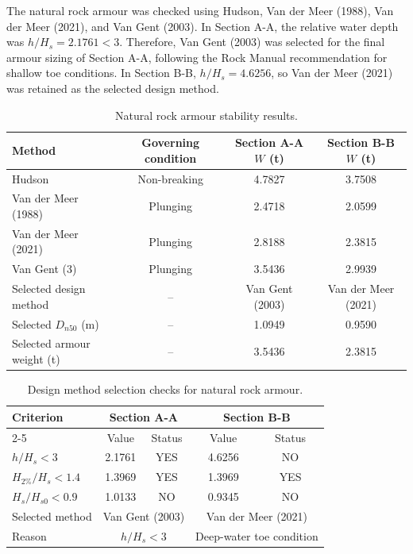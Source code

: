 \documentclass[a4paper, 11pt]{article}
\begin{document}
The natural rock armour was checked using Hudson, Van der Meer (1988), Van der Meer (2021), and Van Gent (2003). In Section A-A, the relative water depth was \(h/H_s=2.1761<3\). Therefore, Van Gent (2003) was selected for the final armour sizing of Section A-A, following the Rock Manual recommendation for shallow toe conditions. In Section B-B, \(h/H_s=4.6256\), so Van der Meer (2021) was retained as the selected design method.

\begin{table}[H]
\centering
\caption{Natural rock armour stability results.}
\label{tab:rmbw_rock_methods}
\begin{tabular}{l c c c}
\hline
Method & Governing condition & Section A-A \(W\) (t) & Section B-B \(W\) (t) \\
\hline
Hudson & Non-breaking & 4.7827 & 3.7508 \\
Van der Meer (1988) & Plunging & 2.4718 & 2.0599 \\
Van der Meer (2021) & Plunging & 2.8188 & 2.3815 \\
Van Gent (3) & Plunging & 3.5436 & 2.9939 \\
\hline
Selected design method & -- & Van Gent (2003) & Van der Meer (2021) \\
Selected \(D_{n50}\) (m) & -- & 1.0949 & 0.9590 \\
Selected armour weight (t) & -- & 3.5436 & 2.3815 \\
\hline
\end{tabular}
\end{table}

\begin{table}[H]
\centering
\caption{Design method selection checks for natural rock armour.}
\label{tab:rmbw_method_selection}
\begin{tabular}{l c c c c}
\hline
\multirow{2}{*}{Criterion} & \multicolumn{2}{c}{Section A-A} & \multicolumn{2}{c}{Section B-B} \\
\cline{2-5}
 & Value & Status & Value & Status \\
\hline
\(h/H_s < 3\) & 2.1761 & YES & 4.6256 & NO \\
\(H_{2\%}/H_s < 1.4\) & 1.3969 & YES & 1.3969 & YES \\
\(H_s/H_{s0} < 0.9\) & 1.0133 & NO & 0.9345 & NO \\
\hline
Selected method & \multicolumn{2}{c}{Van Gent (2003)} & \multicolumn{2}{c}{Van der Meer (2021)} \\
Reason & \multicolumn{2}{c}{\(h/H_s<3\)} & \multicolumn{2}{c}{Deep-water toe condition} \\
\hline
\end{tabular}
\end{table}
\end{document}
